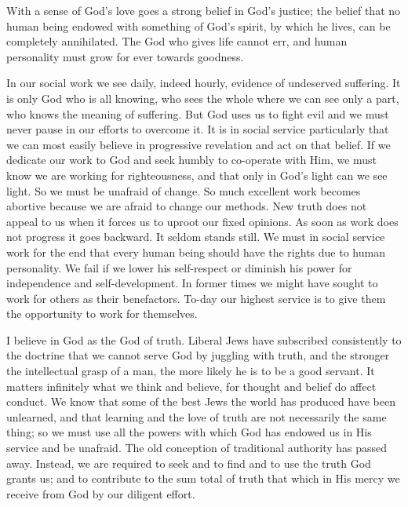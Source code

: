 With a sense of God’s love goes a strong belief in
God’s justice; the belief that no human being endowed
with something of God’s spirit, by which he lives, can be
completely annihilated. The God who gives life cannot
err, and human personality must grow for ever towards
goodness.

In our social work we see daily, indeed hourly,
evidence of undeserved suffering. It is only God who is
all knowing, who sees the whole where we can see only a
part, who knows the meaning of suffering. But God
uses us to fight evil and we must never pause in our
efforts to overcome it. It is in social service particularly
that we can most easily believe in progressive revelation
and act on that belief. If we dedicate our work to
God and seek humbly to co-operate with Him,
we must know we are working for righteousness, and
that only in God’s light can we see light. So
we must be unafraid of change. So much excellent
work becomes abortive because we are afraid to
change our methods. New truth does not appeal to
us when it forces us to uproot our fixed opinions. As
soon as work does not progress it goes backward. It
seldom stands still. We must in social service work for
the end that every human being should have the rights
due to human personality. We fail if we lower his
self-respect or diminish his power for independence and
self-development. In former times we might have sought
to work for others as their benefactors. To-day our
highest service is to give them the opportunity to work
for themselves.

I believe in God as the God of truth. Liberal Jews
have subscribed consistently to the doctrine that we
cannot serve God by juggling with truth, and the stronger
the intellectual grasp of a man, the more likely he is to be
a good servant. It matters infinitely what we think and
believe, for thought and belief do affect conduct. We know
that some of the best Jews the world has produced have
been unlearned, and that learning and the love of truth
are not necessarily the same thing; so we must use all
the powers with which God has endowed us in His service
and be unafraid. The old conception of traditional
authority has passed away. Instead, we are required to
seek and to find and to use the truth God grants us; and
to contribute to the sum total of truth that which in His
mercy we receive from God by our diligent effort.

